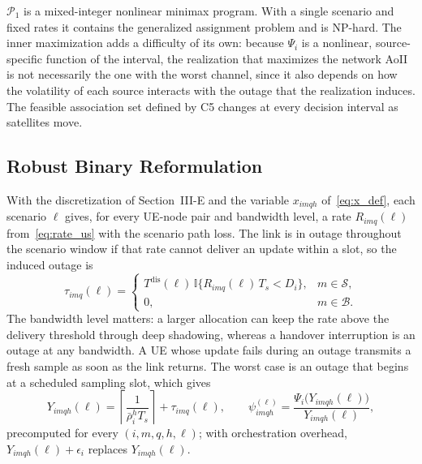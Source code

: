 $\mathscr{P}_{1}$ is a mixed-integer nonlinear minimax program. With a single scenario and fixed rates it contains the
generalized assignment problem and is NP-hard. The inner maximization adds a difficulty of its own: because $\Psi_i$
is a nonlinear, source-specific function of the interval, the realization that maximizes the network AoII is not
necessarily the one with the worst channel, since it also depends on how the volatility of each source interacts with
the outage that the realization induces. The feasible association set defined by C5 changes at every decision
interval as satellites move.

\subsection{Robust Binary Reformulation}

With the discretization of Section~III-E and the variable $x_{imqh}$ of~\eqref{eq:x_def}, each scenario $\ell$ gives,
for every UE-node pair and bandwidth level, a rate $R_{imq}(\ell)$ from~\eqref{eq:rate_us} with the scenario path
loss. The link is in outage throughout the scenario window if that rate cannot deliver an update within a slot, so the
induced outage is
\begin{equation}
    \tau_{imq}(\ell)=
    \begin{cases}
        T^{\mathrm{dis}}(\ell)\,\mathbb{I}\bigl\{R_{imq}(\ell)\,T_s<D_i\bigr\}, & m\in\mathscr{S},\\
        0, & m\in\mathscr{B}.
    \end{cases}
    \label{eq:tau_out}
\end{equation}
The bandwidth level matters: a larger allocation can keep the rate above the delivery threshold through deep
shadowing, whereas a handover interruption is an outage at any bandwidth. A UE whose update fails during an outage
transmits a fresh sample as soon as the link returns. The worst case is an outage that begins at a scheduled sampling
slot, which gives
\begin{equation}
    Y_{imqh}(\ell)=\left\lceil\frac{1}{\bar\rho_i^{h}T_s}\right\rceil+\tau_{imq}(\ell),\qquad
    \psi_{imqh}^{(\ell)}=\frac{\Psi_{i}\bigl(Y_{imqh}(\ell)\bigr)}{Y_{imqh}(\ell)},
    \label{eq:psi_imqh}
\end{equation}
precomputed for every $(i,m,q,h,\ell)$; with orchestration overhead, $Y_{imqh}(\ell)+\epsilon_i$ replaces
$Y_{imqh}(\ell)$.

